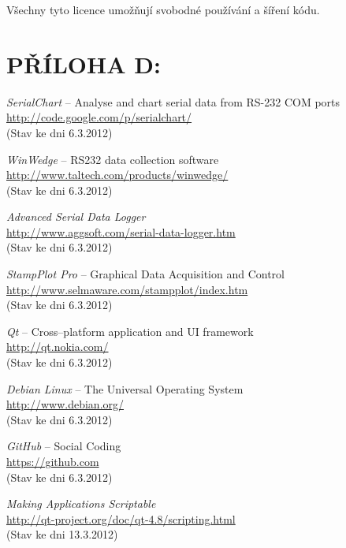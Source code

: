 \documentclass[12pt, a4paper, oneside]{article}
\newcommand{\It}{\textit}  %
\begin{document}
Všechny tyto licence umožňují svobodné používání a šíření kódu.

\newpage
 \section*{PŘÍLOHA D:}
 \begin{thebibliography}{99}

     \It{SerialChart} -- Analyse and chart serial data from RS-232 COM ports \\
    \url{http://code.google.com/p/serialchart/}\\
    (Stav ke dni 6.3.2012)

     \It{WinWedge} -- RS232 data collection software \\
    \url{http://www.taltech.com/products/winwedge/}\\
    (Stav ke dni 6.3.2012)

     \It{Advanced Serial Data Logger} \\
    \url{http://www.aggsoft.com/serial-data-logger.htm}\\
    (Stav ke dni 6.3.2012)

     \It{StampPlot Pro} -- Graphical Data Acquisition and Control \\
    \url{http://www.selmaware.com/stampplot/index.htm}\\
    (Stav ke dni 6.3.2012)

     \It{Qt} -- Cross--platform application and UI framework \\
    \url{http://qt.nokia.com/}\\
    (Stav ke dni 6.3.2012)

     \It{Debian Linux} -- The Universal Operating System \\
    \url{http://www.debian.org/}\\
    (Stav ke dni 6.3.2012)

     \It{GitHub} -- Social Coding \\
    \url{https://github.com}\\
    (Stav ke dni 6.3.2012)

     \It{Making Applications Scriptable} \\
    \url{http://qt-project.org/doc/qt-4.8/scripting.html}\\
    (Stav ke dni 13.3.2012)


\end{thebibliography}
\end{document}
